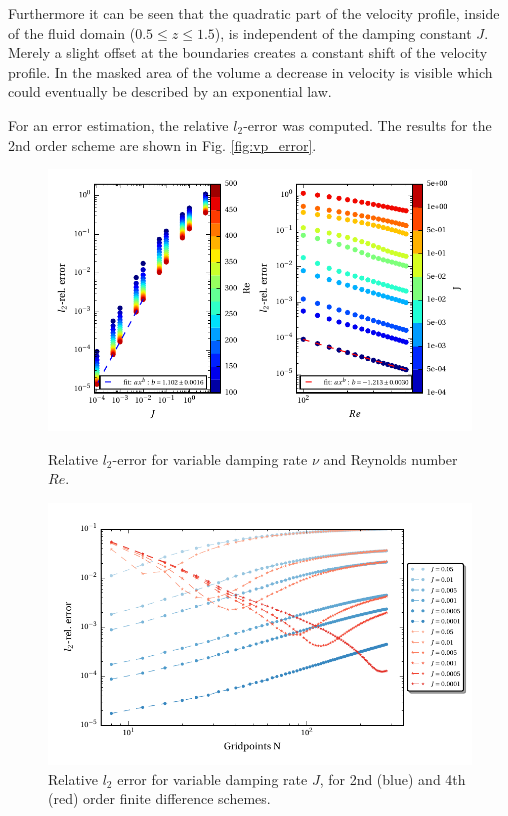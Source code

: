 Furthermore it can be seen that the quadratic part of the velocity profile,
inside of the fluid domain ($0.5\leq z \leq 1.5$), is independent of the damping constant $J$.
Merely a slight offset at the boundaries creates a constant shift of the velocity profile.
In the masked area of the volume a decrease in velocity is visible which could  eventually be described by an
exponential law.

For an error estimation, the relative $l_2$-error was computed.
The results for the 2nd order scheme are shown in Fig. \ref{fig:vp_error}.
\begin{figure}[!b]
  \centering
  \includegraphics{gfx/immersed_boundary/poiseuille_flow/2_vp/vp_error.pdf}  \caption{\label{fig:vp_error}
    Relative $l_2$-error for variable damping rate $\nu$ and Reynolds number $Re$.}
  \centering
  \includegraphics{gfx/immersed_boundary/poiseuille_flow/2_vp/vp_convergence.pdf}
  \caption{\label{fig:vp_conv}
      Relative $l_2$ error for variable damping rate $J$, for 2nd (blue) and 4th (red) order finite difference schemes.}
\end{figure}

